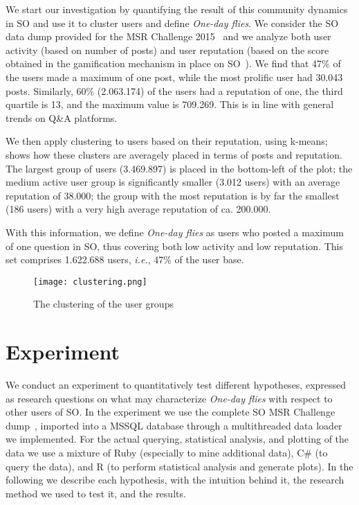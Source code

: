 \documentclass[conference]{IEEEtran}
\newcommand{\ie}{\emph{i.e.},\xspace}
\newcommand\odf{\emph{One-day flies}\xspace}
\begin{document}
We start our investigation by quantifying the result of this community dynamics
in SO and use it to cluster users and define \odf. We consider the SO data dump
provided for the MSR Challenge 2015~\cite{MSRChallenge2015} and we analyze both
user activity (based on number of posts) and user reputation (based on the
score obtained in the gamification mechanism in place on
SO~\cite{anderson2013steering}).  We find that 47\% of the users made a maximum
of one post, while the most prolific user had 30.043 posts. Similarly, 60\%
(2.063.174) of the users had a reputation of one, the third quartile is 13, and
the maximum value is 709.269.  This is in line with general trends on Q\&A
platforms.

We then apply clustering to users based on their reputation, using k-means;
 shows how these clusters are averagely placed in terms
of posts and reputation. The largest group of users (3.469.897) is placed in
the bottom-left of the plot; the medium active user group is significantly
smaller (3.012 users) with an average reputation of 38.000;  the group with the
most reputation is by far the smallest (186 users) with a very high average
reputation of ca. 200.000.

With this information, we define \odf as users who posted a maximum of one
question in SO, thus covering both low activity and low reputation. This set
comprises 1.622.688 users, \ie 47\% of the user base. 

\begin{figure}[h]
 \texttt{[image: clustering.png]}
 \caption{The clustering of the user groups}
 \label{kmeans_clustering}
\end{figure}


\section{Experiment}

We conduct an experiment to quantitatively test different hypotheses, expressed
as research questions on what may characterize \odf with respect to other users
of SO. In the experiment we use the complete SO MSR Challenge
dump~\cite{MSRChallenge2015}, imported into a MSSQL database through a
multithreaded data loader we implemented.  For the actual querying, statistical
analysis, and plotting of the data we use a mixture of Ruby (especially to mine
additional data), C\# (to query the data), and R (to perform statistical
analysis and generate plots).  In the following we describe each hypothesis,
with the intuition behind it, the research method we used to test it, and the
results.
\end{document}
